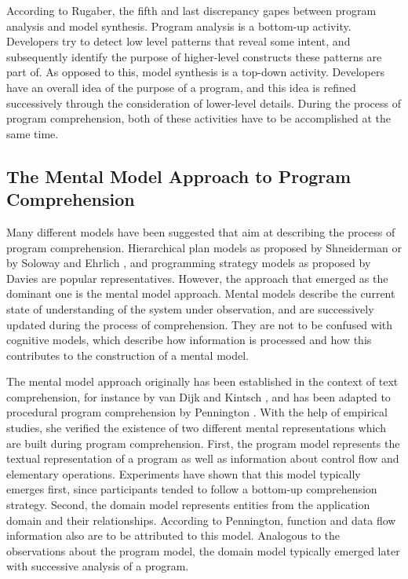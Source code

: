 According to Rugaber, the fifth and last discrepancy gapes between program analysis and model synthesis.
Program analysis is a bottom-up activity.
Developers try to detect low level patterns that reveal some intent, and subsequently identify the purpose of higher-level constructs these patterns are part of.
As opposed to this, model synthesis is a top-down activity.
Developers have an overall idea of the purpose of a program, and this idea is refined successively through the consideration of lower-level details.
During the process of program comprehension, both of these activities have to be accomplished at the same time.

\subsection{The Mental Model Approach to Program Comprehension}
\label{ss:BackgroundComprehensionMentalModel}
Many different models have been suggested that aim at describing the process of program comprehension.
Hierarchical plan models as proposed by Shneiderman \cite{shneiderman_exploratory_1976} or by Soloway and Ehrlich \cite{soloway_empirical_1984}, and programming strategy models as proposed by Davies \cite{davies_role_1991} are popular representatives.
However, the approach that emerged as the dominant one is the mental model approach.
Mental models describe the current state of understanding of the system under observation, and are successively updated during the process of comprehension.
They are not to be confused with cognitive models, which describe how information is processed and how this contributes to the construction of a mental model.

The mental model approach originally has been established in the context of text comprehension, for instance by van Dijk and Kintsch \cite{van_dijk_strategies_1983}, and has been adapted to procedural program comprehension by Pennington \cite{pennington_comprehension_1987, pennington_stimulus_1987}.
With the help of empirical studies, she verified the existence of two different mental representations which are built during program comprehension.
First, the program model represents the textual representation of a program as well as information about control flow and elementary operations.
Experiments have shown that this model typically emerges first, since participants tended to follow a bottom-up comprehension strategy.
Second, the domain model represents entities from the application domain and their relationships.
According to Pennington, function and data flow information also are to be attributed to this model.
Analogous to the observations about the program model, the domain model typically emerged later with successive analysis of a program.

